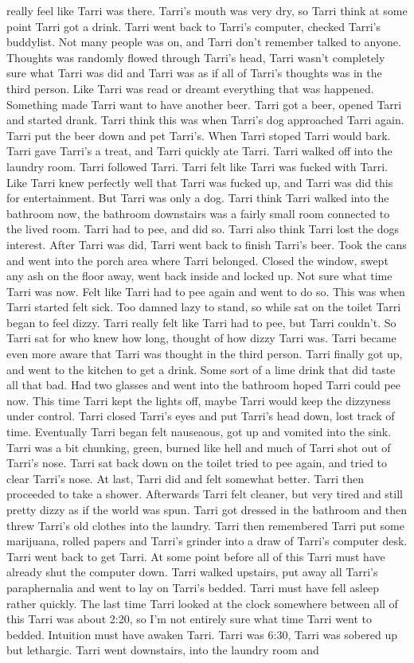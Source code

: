 \documentclass[12pt]{book}
\begin{document}
really feel like Tarri was there. Tarri's mouth was very dry, so Tarri think at some point Tarri got a drink. Tarri went back to Tarri's computer, checked Tarri's buddylist. Not many people was on, and Tarri don't remember talked to anyone. Thoughts was randomly flowed through Tarri's head, Tarri wasn't completely sure what Tarri was did and Tarri was as if all of Tarri's thoughts was in the third person. Like Tarri was read or dreamt everything that was happened. Something made Tarri want to have another beer. Tarri got a beer, opened Tarri and started drank. Tarri think this was when Tarri's dog approached Tarri again. Tarri put the beer down and pet Tarri's. When Tarri stoped Tarri would bark. Tarri gave Tarri's a treat, and Tarri quickly ate Tarri. Tarri walked off into the laundry room. Tarri followed Tarri. Tarri felt like Tarri was fucked with Tarri. Like Tarri knew perfectly well that Tarri was fucked up, and Tarri was did this for entertainment. But Tarri was only a dog. Tarri think Tarri walked into the bathroom now, the bathroom downstairs was a fairly small room connected to the lived room. Tarri had to pee, and did so. Tarri also think Tarri lost the dogs interest. After Tarri was did, Tarri went back to finish Tarri's beer. Took the cans and went into the porch area where Tarri belonged. Closed the window, swept any ash on the floor away, went back inside and locked up. Not sure what time Tarri was now. Felt like Tarri had to pee again and went to do so. This was when Tarri started felt sick. Too damned lazy to stand, so while sat on the toilet Tarri began to feel dizzy. Tarri really felt like Tarri had to pee, but Tarri couldn't. So Tarri sat for who knew how long, thought of how dizzy Tarri was. Tarri became even more aware that Tarri was thought in the third person. Tarri finally got up, and went to the kitchen to get a drink. Some sort of a lime drink that did taste all that bad. Had two glasses and went into the bathroom hoped Tarri could pee now. This time Tarri kept the lights off, maybe Tarri would keep the dizzyness under control. Tarri closed Tarri's eyes and put Tarri's head down, lost track of time. Eventually Tarri began felt nauseaous, got up and vomited into the sink. Tarri was a bit chunking, green, burned like hell and much of Tarri shot out of Tarri's nose. Tarri sat back down on the toilet tried to pee again, and tried to clear Tarri's nose. At last, Tarri did and felt somewhat better. Tarri then proceeded to take a shower. Afterwards Tarri felt cleaner, but very tired and still pretty dizzy as if the world was spun. Tarri got dressed in the bathroom and then threw Tarri's old clothes into the laundry. Tarri then remembered Tarri put some marijuana, rolled papers and Tarri's grinder into a draw of Tarri's computer desk. Tarri went back to get Tarri. At some point before all of this Tarri must have already shut the computer down. Tarri walked upstairs, put away all Tarri's paraphernalia and went to lay on Tarri's bedded. Tarri must have fell asleep rather quickly. The last time Tarri looked at the clock somewhere between all of this Tarri was about 2:20, so I'm not entirely sure what time Tarri went to bedded. Intuition must have awaken Tarri. Tarri was 6:30, Tarri was sobered up but lethargic. Tarri went downstairs, into the laundry room and 
\end{document}
